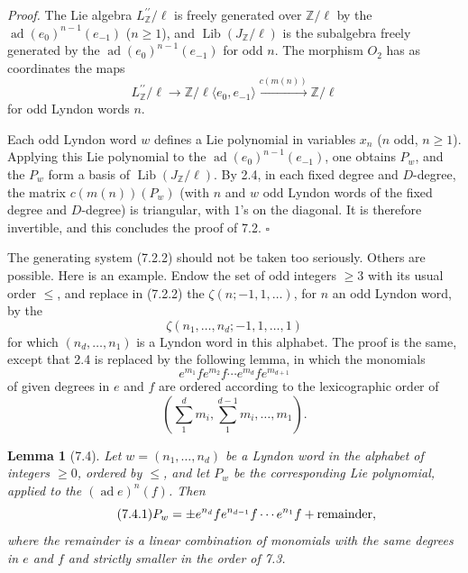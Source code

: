 \documentclass[10pt,a4paper]{article}
\newcommand{\Z}{\mathbb Z}
\newcommand{\ad}{\operatorname{ad}}
\newcommand{\Lib}{\operatorname{Lib}}
\theoremstyle{deligne}
\newtheorem*{lemma*}{Lemma}
\newenvironment{proofdel}{\textit{Proof.}}{\hfill$\square$}
\newcommand{\heading}[1]{\vspace{0.65em}\noindent{\bfseries #1}\quad}
\begin{document}
\begin{proofdel}
The Lie algebra \(L^{\prime\prime}_\Z/\ell\) is freely generated over \(\Z/\ell\) by the \(\ad(e_0)^{n-1}(e_{-1})\) (\(n\ge1\)), and \(\Lib(J_\Z/\ell)\) is the subalgebra freely generated by the \(\ad(e_0)^{n-1}(e_{-1})\) for odd \(n\). The morphism \(O_2\) has as coordinates the maps
\[
L^{\prime\prime}_\Z/\ell\longrightarrow \Z/\ell\langle e_0,e_{-1}\rangle
\xrightarrow{c(m(n))}\Z/\ell
\]
for odd Lyndon words \(n\).

Each odd Lyndon word \(w\) defines a Lie polynomial in variables \(x_n\) (\(n\) odd, \(n\ge1\)). Applying this Lie polynomial to the \(\ad(e_0)^{n-1}(e_{-1})\), one obtains \(P_w\), and the \(P_w\) form a basis of \(\Lib(J_\Z/\ell)\). By 2.4, in each fixed degree and \(D\)-degree, the matrix \(c(m(n))(P_w)\) (with \(n\) and \(w\) odd Lyndon words of the fixed degree and \(D\)-degree) is triangular, with \(1\)'s on the diagonal. It is therefore invertible, and this concludes the proof of 7.2.
\end{proofdel}

\heading{7.3.} The generating system (7.2.2) should not be taken too seriously. Others are possible. Here is an example. Endow the set of odd integers \(\ge3\) with its usual order \(\le\), and replace in (7.2.2) the \(\zeta(n;-1,1,\ldots)\), for \(n\) an odd Lyndon word, by the
\[
\zeta(n_1,\ldots,n_d;-1,1,\ldots,1)
\]
for which \((n_d,\ldots,n_1)\) is a Lyndon word in this alphabet. The proof is the same, except that 2.4 is replaced by the following lemma, in which the monomials
\[
e^{m_1}fe^{m_2}f\cdots e^{m_d}fe^{m_{d+1}}
\]
of given degrees in \(e\) and \(f\) are ordered according to the lexicographic order of
\[
\left(\sum_{1}^{d}m_i,\sum_{1}^{d-1}m_i,\ldots,m_1\right).
\]

\begin{lemma*}[7.4]
Let \(w=(n_1,\ldots,n_d)\) be a Lyndon word in the alphabet of integers \(\ge0\), ordered by \(\le\), and let \(P_w\) be the corresponding Lie polynomial, applied to the \((\ad e)^n(f)\). Then
\[
\tag{7.4.1}
P_w=\pm e^{n_d}fe^{n_{d-1}}f\cdots e^{n_1}f+\hbox{remainder},
\]
where the remainder is a linear combination of monomials with the same degrees in \(e\) and \(f\) and strictly smaller in the order of 7.3.
\end{lemma*}
\end{document}
